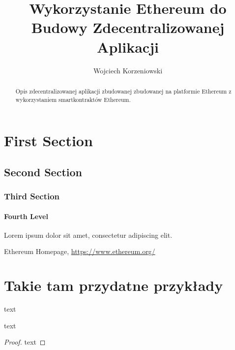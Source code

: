 \documentclass[]{llncs}
\begin{document}
\title{Wykorzystanie Ethereum do Budowy Zdecentralizowanej Aplikacji}
\author{Wojciech Korzeniowski}

\maketitle

\begin{abstract}

  Opis zdecentralizowanej aplikacji zbudowanej zbudowanej na platformie Ethereum
  z wykorzystaniem smartkontraktów Ethereum\cite{ethereum}.

\end{abstract}

\section{First Section}
\subsection{Second Section}
\subsubsection{Third Section}
\paragraph{Fourth Level}
Lorem ipsum dolor sit amet, consectetur adipiscing elit.


%
%
%
% 
% 
%
\begin{thebibliography}{8}
   Ethereum Homepage, \url{https://www.ethereum.org/}
\end{thebibliography}




\newpage
\newpage

\section{Takie tam przydatne przykłady}
\begin{definition} text \end{definition}
\begin{case} text \end{case}
\begin{proof} text \end{proof}
\end{document}
